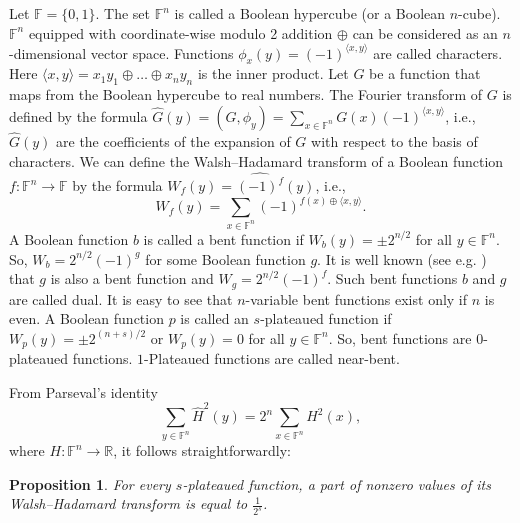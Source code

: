 \documentclass[a4paper,12pt]{article}   %
\newtheorem{proposition}{Proposition}
\begin{document}
Let $\mathbb{F}= \{0, 1\}$. The set $\mathbb{F}^n$ is called a
Boolean hypercube (or a Boolean $n$-cube). $\mathbb{F}^n$ equipped
with  coordinate-wise modulo 2 addition $\oplus$ can be considered
as an $n$-dimensional vector space. Functions
 $\phi_x(y)=(-1)^{\langle x,y\rangle}$ are called characters. Here $\langle
x,y\rangle=x_1y_1\oplus\dots\oplus x_ny_n$ is the inner product. Let
$G$ be a function that  maps from the Boolean hypercube to real
numbers. The Fourier transform of $G$ is defined by the formula
$\widehat{G}(y)=(G,\phi_y)=\sum\limits _{x\in
\mathbb{F}^n}G(x)(-1)^{ \langle x,y\rangle}$, i.e., $\widehat{G}(y)$
are the coefficients of the expansion of $G$ with respect to the
basis of characters. We can define the Walsh--Hadamard transform of
a Boolean function $f:\mathbb{F}^n\rightarrow \mathbb{F}$  by the
formula $W_f(y)=\widehat{(-1)^f}(y)$, i.e.,
$$W_f(y)=\sum\limits_{x\in \mathbb{F}^n}(-1)^{f(x)\oplus \langle
x,y\rangle}.$$ A Boolean function $b$ is called a bent function if
$W_b(y)=\pm 2^{n/2}$ for all $y\in \mathbb{F}^n$.  So,
$W_b=2^{n/2}(-1)^g$ for some Boolean function $g$. It is well known
(see  e.g. \cite{Carlet, Mes0}) that $g$ is also a bent function and
$W_g=2^{n/2}(-1)^f$. Such bent functions $b$ and $g$ are called
{dual}.
 It is easy to see that $n$-variable bent
functions  exist only if $n$ is even. A Boolean function $p$ is
called an $s$-plateaued function if $W_p(y)=\pm 2^{(n+s)/2}$  or
$W_p(y)=0$ for all $y\in \mathbb{F}^n$. So, bent functions are
$0$-plateaued functions. $1$-Plateaued functions are called
near-bent.

From Parseval's identity  $$\sum\limits_{y\in \mathbb{F}^n}
\widehat{H}^2(y)= 2^{n}\sum\limits_{x\in \mathbb{F}^n}H^2(x),$$
where $H:\mathbb{F}^n\rightarrow \mathbb{R}$, it follows
straightforwardly:
\begin{proposition}\label{bentpla00}
For every  $s$-plateaued function,  a part of nonzero values of its
Walsh--Hadamard transform is equal to $\frac{1}{2^s}$.
\end{proposition}
\end{document}
